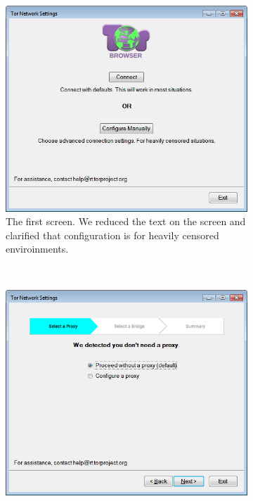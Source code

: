 \documentclass[USenglish,oneside,twocolumn]{article}
\begin{document}
\begin{figure}
\centering
\begin{subfigure}[b]{0.35\textwidth}
	\includegraphics[width=\textwidth]{screenshots/NEW-first.png}
	\caption{The first screen. We reduced the text on the screen and clarified that configuration is for heavily censored enviroinments.}
	\label{fig:new-first}
\end{subfigure}
~~~~~~~~~~
\begin{subfigure}[b]{0.35\textwidth}
	\includegraphics[width=\textwidth]{screenshots/NEW-proxyYES.png}

\end{subfigure}
\end{figure}
\end{document}
